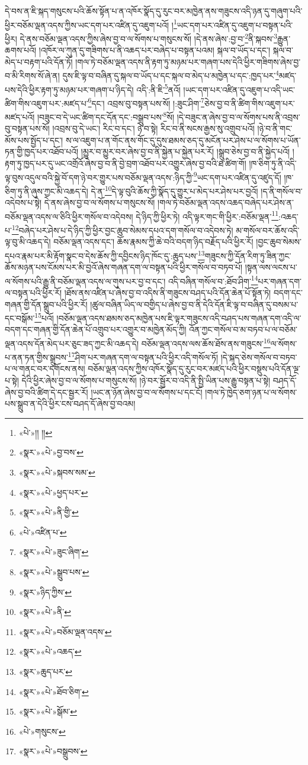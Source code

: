དེ་བས་ན་ཇི་སྐད་གསུངས་པའི་ཆོས་སྟོན་པ་ན་འཁོར་སྣོད་དུ་རུང་བར་མཁྱེན་ནས་གཟུངས་འདི་ཉན་དུ་གཞུག་པའི་ཕྱིར་བཅོམ་ལྡན་འདས་ཀྱིས་ཡང་དག་པར་འཛིན་དུ་འཇུག་པའོ། །\footnote{«པེ་»།། །།}ཡང་དག་པར་འཛིན་དུ་འཇུག་པ་བསྟན་པའི་ཕྱིར། དེ་ནས་བཅོམ་ལྡན་འདས་ཀྱིས་ཞེས་བྱ་བ་ལ་སོགས་པ་གསུངས་སོ། །དེ་ནས་ཞེས་:བྱ་བ་\footnote{«སྣར་»«པེ་»བྱ་བས་}ནི་སྐབས་\footnote{«སྣར་»«པེ་»སྐབས་སམ་}རྒྱུན་ཆགས་པའོ། །འཁོར་ལ་ཀུན་དུ་གཟིགས་པ་ནི་འཆད་པར་བཞེད་པ་བསྟན་པའམ། སྐལ་བ་ཡོད་པ་དང་། སྐལ་བ་མེད་པ་བརྟག་པའི་དོན་ཏོ། །གལ་ཏེ་བཅོམ་ལྡན་འདས་ནི་རྟག་ཏུ་མཉམ་པར་གཞག་པས་དེའི་ཕྱིར་གཟིགས་ཞེས་བྱ་བ་མི་རིགས་སོ་ཞེ་ན། དུས་ཇི་ལྟ་བ་བཞིན་དུ་སྐལ་བ་ཡོད་པ་དང་སྐལ་བ་མེད་པ་མཁྱེན་པ་དང་:ཁྱད་པར་\footnote{«སྣར་»«པེ་»ཕྱད་པར་}མཛད་པས་དེའི་ཕྱིར་རྟག་ཏུ་མཉམ་པར་གཞག་པ་ཉིད་དེ། འདི་:ནི་ཇི་\footnote{«སྣར་»«པེ་»ནི་གྱི་}ནའོ། །ཡང་དག་པར་འཛིན་དུ་འཇུག་པ་འདི་ཡང་ཚིག་གིས་འཇུག་པར་:མཛད་པ་\footnote{«པེ་»འཛིན་པ་}དང་། འབྲས་བུ་བསྟན་པས་སོ། །:ཟུང་ཤིག་\footnote{«སྣར་»«པེ་»ཟུང་ཞིག་}ཅེས་བྱ་བ་ནི་ཚིག་གིས་འཇུག་པར་མཛད་པའོ། །བཟུང་བ་དེ་ཡང་ཚིག་དང་དོན་དང་:བསྒྲུབ་པས་\footnote{«སྣར་»«པེ་»སྒྲུབ་པས་}སོ། །དེ་བཟུང་ན་ཞེས་བྱ་བ་ལ་སོགས་པས་ནི་འབྲས་བུ་བསྟན་པས་སོ། །འབྲས་བུ་དེ་ཡང་། རིང་བ་དང་། ཉེ་བ་སྟེ། རིང་བ་ནི་སངས་རྒྱས་སུ་འགྲུབ་པའོ། །ཉེ་བ་ནི་གང་མོས་པས་སྤྱོད་པ་དང་། ས་ལ་འཇུག་པ་ན་གོང་ནས་གོང་དུ་དུས་ཐམས་ཅད་དུ་མངོན་པར་ཤེས་པ་ལ་སོགས་པ་ཡོན་ཏན་གྱི་ཁྱད་པར་འཐོབ་པའོ། །མྱུར་བ་མྱུར་བར་ཞེས་བྱ་བ་ནི་སྐྱེན་པ་སྐྱེན་པར་རོ། །སྒྲུབ་ཅེས་བྱ་བ་ནི་སྐྱེད་པའོ། །རྟག་ཏུ་ཁྱད་པར་དུ་ཡང་འགྲོའོ་ཞེས་བྱ་བ་ནི་བྱེ་བྲག་འཐོབ་པར་འགྱུར་ཞེས་བྱ་བའི་ཐ་ཚིག་གོ། །ཁ་ཅིག་ཏུ་ནི་འདི་ལྟ་བུས་འདུལ་བའི་སྐྱེ་བོ་དག་ཉེ་བར་གྱུར་པས་བཅོམ་ལྡན་འདས་:ཉིད་ཀྱི་\footnote{«སྣར་»ཉིད་ཀྱིས་}ཡང་དག་པར་འཛིན་དུ་འཛུད་དོ། །ཁ་ཅིག་ཏུ་ནི་ཞུས་ཀྱང་མི་འཆད་དེ། དེ་ན་\footnote{«སྣར་»«པེ་»ནི་}དེ་ལྟ་བུའི་ཆོས་ཀྱི་སྣོད་དུ་གྱུར་པ་མེད་པར་ཤེས་པར་བྱའོ། །ད་ནི་གསོལ་བ་འདེབས་པ་སྟེ། དེ་ནས་ཞེས་བྱ་བ་ལ་སོགས་པ་གསུངས་སོ། །གལ་ཏེ་བཅོམ་ལྡན་འདས་འཆད་བཞེད་པར་ཤེས་ན་བཅོམ་ལྡན་འདས་ལ་ཅིའི་ཕྱིར་གསོལ་བ་འདེབས། དེ་ཉིད་ཀྱི་ཕྱིར་ཏེ། འདི་ལྟར་གང་གི་ཕྱིར་:བཅོམ་ལྡན་\footnote{«སྣར་»«པེ་»བཅོམ་ལྡན་འདས་}:འཆད་པ་\footnote{«སྣར་»«པེ་»འཆད་}བཞེད་པར་ཤེས་པ་དེ་ཉིད་ཀྱི་ཕྱིར་བྱང་ཆུབ་སེམས་དཔའ་དག་གསོལ་བ་འདེབས་ཏེ། མ་གསོལ་བར་ཆོས་འདི་ལྟ་བུ་མི་འཆད་དེ། བཅོམ་ལྡན་འདས་དང་། ཆོས་རྣམས་ཀྱི་ཆེ་བའི་བདག་ཉིད་བརྗོད་པའི་ཕྱིར་རོ། །བྱང་ཆུབ་སེམས་དཔའ་རྣམ་པར་མི་རྟོག་སྣང་བ་དེས་ཆོས་ཀྱི་དབྱིངས་ཉིད་ཁོང་དུ་:ཆུད་པས་\footnote{«སྣར་»ཆུད་པར་}གཟུངས་ཀྱི་དོན་རིག་ཏུ་ཟིན་ཀྱང་ཆོས་མཉན་པས་ངོམས་པར་མི་བྱའོ་ཞེས་གཞན་དག་ལ་བསྟན་པའི་ཕྱིར་གསོལ་བ་བཏབ་པོ། །སྟན་ལས་ལངས་པ་ལ་སོགས་པའི་རྒྱུ་ནི་བཅོམ་ལྡན་འདས་ལ་གུས་པར་བྱ་བ་དང་། འདི་བཞིན་གསོལ་བ་:ཐོབ་ཤིག་\footnote{«སྣར་»«པེ་»ཐོབ་ཅིག་}པར་གཞན་དག་ལ་བསྟན་པའི་ཕྱིར་རོ། །ཐོས་ནས་འཛིན་པ་ཞེས་བྱ་བ་འདིས་ནི་གཟུངས་བཤད་པའི་དོན་ཆེན་པོ་སྟོན་ཏེ། བདག་དང་གཞན་གྱི་དོན་སྒྲུབ་པའི་ཕྱིར་རོ། །ཚུལ་བཞིན་ཡིད་ལ་བགྱིད་པ་ཞེས་བྱ་བ་ནི་དེའི་དོན་ཇི་ལྟ་བ་བཞིན་དུ་བསམ་པ་དང་བསྒོམ་\footnote{«སྣར་»«པེ་»སྒོམ་}པའོ། །བཅོམ་ལྡན་འདས་ཐམས་ཅད་མཁྱེན་པས་ཇི་ལྟར་གཟུངས་འདི་བཤད་པས་གཞན་དག་འདི་ལ་བདག་དང་གཞན་གྱི་དོན་ཆེན་པོ་འགྲུབ་པར་འགྱུར་བ་མཁྱེན་མོད་ཀྱི། འོན་ཀྱང་གསོལ་བ་མ་བཏབ་པ་ལ་བཅོམ་ལྡན་འདས་དོན་མེད་པར་ཅུང་ཟད་ཀྱང་མི་འཆད་དེ། བཅོམ་ལྡན་འདས་ལས་ཆོས་ཐོས་ནས་གཟུངས་\footnote{«པེ་»གསུངས་}ལ་སོགས་པ་ནན་ཏན་གྱིས་སྒྲུབས་\footnote{«སྣར་»«པེ་»བསྒྲུབས་}ཤིག་པར་གཞན་དག་ལ་བསྟན་པའི་ཕྱིར་འདི་གསོལ་ཏོ། །དེ་སྐད་ཅེས་གསོལ་བ་བཏབ་པ་ལ་གནང་བར་དགོངས་ནས། བཅོམ་ལྡན་འདས་ཀྱིས་འཁོར་སྣོད་དུ་རུང་བར་མཛད་པའི་ཕྱིར་བསྡུས་པའི་དོན་ལྔ་པ་སྟེ། དེའི་ཕྱིར་ཞེས་བྱ་བ་ལ་སོགས་པ་གསུངས་སོ། །ཉེ་བར་སྦྱོར་བ་འདི་ནི་སྤྱི་ཡིན་པས་རྒྱུ་བསྟན་པ་སྟེ། བཤད་དོ་ཞེས་བྱ་བའི་ཚིག་དེ་དང་སྦྱར་རོ། །ཡང་ན་ཉོན་ཞེས་བྱ་བ་ལ་སོགས་པ་དང་ངོ། །གལ་ཏེ་ཁྱེད་ཅག་ཉན་པ་ལ་སོགས་པས་སྒྲུབ་ན་དེའི་ཕྱིར་ངས་བཤད་དོ་ཞེས་བྱ་བའམ། 